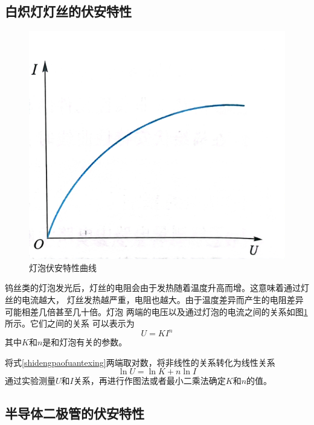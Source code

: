 \documentclass{ctexart}
\begin{document}
  \subsection{白炽灯灯丝的伏安特性}
  \begin{figure}[b]
    \centering
    \includegraphics[width=1\textwidth]{dengpaofuantexing.jpg}
    \caption{灯泡伏安特性曲线}\label{dengpaofuantexing}
  \end{figure}
  钨丝类的灯泡发光后，灯丝的电阻会由于发热随着温度升高而增。这意味着通过灯丝的电流越大，
  灯丝发热越严重，电阻也越大。由于温度差异而产生的电阻差异可能相差几倍甚至几十倍。灯泡
  两端的电压以及通过灯泡的电流之间的关系如图\ref{dengpaofuantexing}所示。它们之间的关系
  可以表示为
  \begin{equation}\label{shidengpaofuantexing}
    U=KI^{n}
  \end{equation}
  其中$K$和$n$是和灯泡有关的参数。

  将式\ref{shidengpaofuantexing}两端取对数，将非线性的关系转化为线性关系
  \begin{equation}
    \ln U=\ln K+n\ln I
  \end{equation}
  通过实验测量$U$和$I$关系，再进行作图法或者最小二乘法确定$K$和$n$的值。

  \subsection{半导体二极管的伏安特性}
\end{document}
